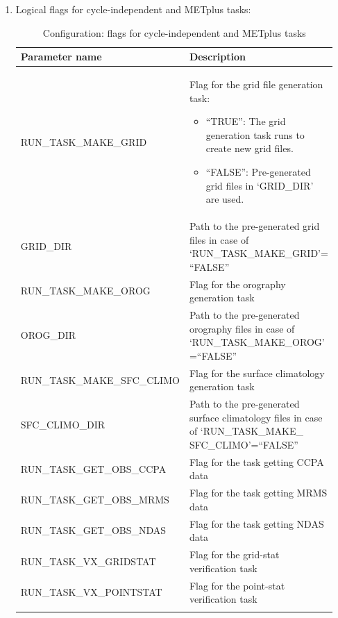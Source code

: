\documentclass[11pt,fleqn]{report}              %
\begin{document}
\begin{enumerate}
\item Logical flags for cycle-independent and METplus tasks:
{
\scriptsize
\begin{longtable}{p{0.28\linewidth} | p{0.67\linewidth} }
\hline
\hline
Parameter name & Description \\
\hline
RUN\_TASK\_MAKE\_GRID  & Flag for the grid file generation task: \begin{itemize} \item ``TRUE'': The grid generation task runs to create new grid files. \item ``FALSE'': Pre-generated grid files in `GRID\_DIR' are used. \end{itemize} \\
GRID\_DIR & Path to the pre-generated grid files in case of `RUN\_TASK\_MAKE\_GRID'= ``FALSE'' \\
RUN\_TASK\_MAKE\_OROG & Flag for the orography generation task \\
OROG\_DIR & Path to the pre-generated orography files in case of `RUN\_TASK\_MAKE\_OROG' =``FALSE'' \\
RUN\_TASK\_MAKE\_SFC\_CLIMO & Flag for the surface climatology generation task \\
SFC\_CLIMO\_DIR & Path to the pre-generated surface climatology files in case of `RUN\_TASK\_MAKE\_ SFC\_CLIMO'=``FALSE'' \\
RUN\_TASK\_GET\_OBS\_CCPA & Flag for the task getting CCPA data \\
RUN\_TASK\_GET\_OBS\_MRMS & Flag for the task getting MRMS data \\
RUN\_TASK\_GET\_OBS\_NDAS & Flag for the task getting NDAS data \\
RUN\_TASK\_VX\_GRIDSTAT & Flag for the grid-stat verification task \\
RUN\_TASK\_VX\_POINTSTAT & Flag for the point-stat verification task\\
\hline
\caption{Configuration: flags for cycle-independent and METplus tasks}
\label{table:config_fix_met_tasks}
\end{longtable}
}


\end{enumerate}
\end{document}
